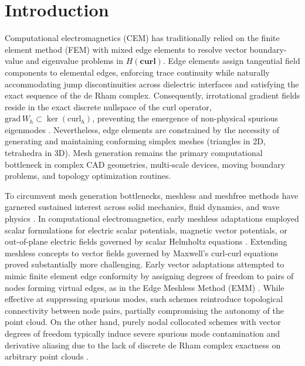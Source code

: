 \documentclass[VANCOUVER,Times1COL]{WileyNJD-v5}
\begin{document}
\section{Introduction}
\label{sec:introduction}

Computational electromagnetics (CEM) has traditionally relied on the finite element method (FEM) with mixed edge elements \cite{nedelec1980mixed, monk2003finite, jin2014finite} to resolve vector boundary-value and eigenvalue problems in $H(\mathbf{curl})$. Edge elements assign tangential field components to elemental edges, enforcing trace continuity while naturally accommodating jump discontinuities across dielectric interfaces and satisfying the exact sequence of the de Rham complex. Consequently, irrotational gradient fields reside in the exact discrete nullspace of the curl operator, $\mathrm{grad} \, W_h \subset \ker(\mathrm{curl}_h)$, preventing the emergence of non-physical spurious eigenmodes \cite{bossavit1998computational, boffi2006finite}. Nevertheless, edge elements are constrained by the necessity of generating and maintaining conforming simplex meshes (triangles in 2D, tetrahedra in 3D). Mesh generation remains the primary computational bottleneck in complex CAD geometries, multi-scale devices, moving boundary problems, and topology optimization routines.

To circumvent mesh generation bottlenecks, meshless and meshfree methods have garnered sustained interest across solid mechanics, fluid dynamics, and wave physics \cite{belytschko2023meshfree, liu2009mesh, fasshauer2007meshfree, atluri2004meshless}. In computational electromagnetics, early meshless adaptations employed scalar formulations for electric scalar potentials, magnetic vector potentials, or out-of-plane electric fields governed by scalar Helmholtz equations \cite{viana1999moving, ho2001moving, parreira2006element, nicomedes2012meshless}. Extending meshless concepts to vector fields governed by Maxwell's curl-curl equations proved substantially more challenging. Early vector adaptations attempted to mimic finite element edge conformity by assigning degrees of freedom to pairs of nodes forming virtual edges, as in the Edge Meshless Method (EMM) \cite{lima2017edge}. While effective at suppressing spurious modes, such schemes reintroduce topological connectivity between node pairs, partially compromising the autonomy of the point cloud. On the other hand, purely nodal collocated schemes with vector degrees of freedom typically induce severe spurious mode contamination and derivative aliasing due to the lack of discrete de Rham complex exactness on arbitrary point clouds \cite{bossavit1990spurious, boffi2006finite}.
\end{document}
